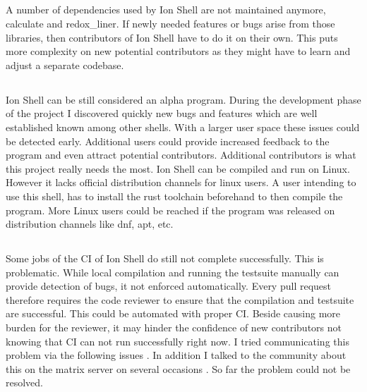 \subsection{\itemIonShellDependencies}\label{itemIonShellDependencies}

A number of dependencies used by Ion Shell are not maintained anymore, calculate and redox\_liner.
If newly needed features or bugs arise from those libraries,
then contributors of Ion Shell have to do it on their own.
This puts more complexity on new potential contributors
as they might have to learn and adjust a separate codebase.

\subsection{\itemIonShellDistribution}\label{itemIonShellDistribution}

Ion Shell can be still considered an alpha program.
During the development phase of the project I discovered quickly new bugs
and features which are well established known among other shells.
With a larger user space these issues could be detected early.
Additional users could provide increased feedback to the program and even attract potential contributors.
Additional contributors is what this project really needs the most.
Ion Shell can be compiled and run on Linux.
However it lacks official distribution channels for linux users.
A user intending to use this shell, has to install the rust toolchain beforehand to then compile the program.
More Linux users could be reached if the program was released on distribution channels like dnf, apt, etc.

\subsection{\itemIonShellCI}\label{section:ci_ion_shell}

Some jobs of the CI of Ion Shell do still not complete successfully.
This is problematic. While local compilation and running the testsuite manually can provide detection of bugs, it not enforced automatically.
Every pull request therefore requires the code reviewer to
ensure that the compilation and testsuite are successful.
This could be automated with proper CI.
Beside causing more burden for the reviewer, it may hinder
the confidence of new contributors not knowing that CI can not run successfully right now.
I tried communicating this problem via the following issues \cite{issue_ci_linux_stable_fail}.
In addition I talked to the community
about this on the matrix server on several occasions \cite{matrix_channel}.
So far the problem could not be resolved.


